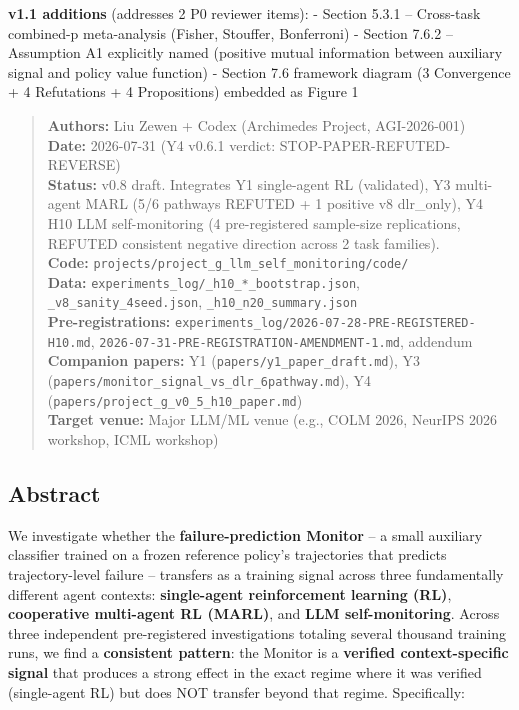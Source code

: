 \documentclass[11pt]{article}
\begin{document}
\textbf{v1.1 additions} (addresses 2 P0 reviewer items): - Section 5.3.1
-- Cross-task combined-p meta-analysis (Fisher, Stouffer, Bonferroni) -
Section 7.6.2 -- Assumption A1 explicitly named (positive mutual
information between auxiliary signal and policy value function) -
Section 7.6 framework diagram (3 Convergence + 4 Refutations + 4
Propositions) embedded as Figure 1

\begin{quote}
\textbf{Authors:} Liu Zewen + Codex (Archimedes Project, AGI-2026-001)\\
\textbf{Date:} 2026-07-31 (Y4 v0.6.1 verdict:
STOP-PAPER-REFUTED-REVERSE)\\
\textbf{Status:} v0.8 draft. Integrates Y1 single-agent RL (validated),
Y3 multi-agent MARL (5/6 pathways REFUTED + 1 positive v8 dlr\_only), Y4
H10 LLM self-monitoring (4 pre-registered sample-size replications,
REFUTED consistent negative direction across 2 task families).\\
\textbf{Code:}
\texttt{projects/project\_g\_llm\_self\_monitoring/code/}\\
\textbf{Data:} \texttt{experiments\_log/\_h10\_*\_bootstrap.json},
\texttt{\_v8\_sanity\_4seed.json}, \texttt{\_h10\_n20\_summary.json}\\
\textbf{Pre-registrations:}
\texttt{experiments\_log/2026-07-28-PRE-REGISTERED-H10.md},
\texttt{2026-07-31-PRE-REGISTRATION-AMENDMENT-1.md}, addendum\\
\textbf{Companion papers:} Y1 (\texttt{papers/y1\_paper\_draft.md}), Y3
(\texttt{papers/monitor\_signal\_vs\_dlr\_6pathway.md}), Y4
(\texttt{papers/project\_g\_v0\_5\_h10\_paper.md})\\
\textbf{Target venue:} Major LLM/ML venue (e.g., COLM 2026, NeurIPS 2026
workshop, ICML workshop)
\end{quote}

\subsection{Abstract}\label{abstract}

We investigate whether the \textbf{failure-prediction Monitor} -- a
small auxiliary classifier trained on a frozen reference policy's
trajectories that predicts trajectory-level failure -- transfers as a
training signal across three fundamentally different agent contexts:
\textbf{single-agent reinforcement learning (RL)}, \textbf{cooperative
multi-agent RL (MARL)}, and \textbf{LLM self-monitoring}. Across three
independent pre-registered investigations totaling several thousand
training runs, we find a \textbf{consistent pattern}: the Monitor is a
\textbf{verified context-specific signal} that produces a strong effect
in the exact regime where it was verified (single-agent RL) but does NOT
transfer beyond that regime. Specifically:
\end{document}
